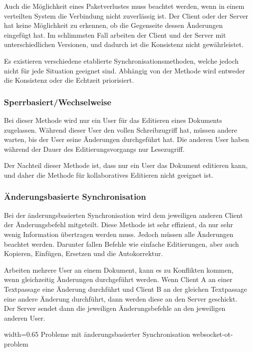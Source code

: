 Auch die Möglichkeit eines Paketverlustes muss beachtet werden, wenn in einem verteilten System die Verbindung nicht zuverlässig ist. Der Client oder der Server hat keine Möglichkeit zu erkennen, ob die Gegenseite dessen Änderungen eingefügt hat. Im schlimmsten Fall arbeiten der Client und der Server mit unterschiedlichen Versionen, und dadurch ist die Konsistenz nicht gewährleistet. \cite{websocket-consistency-tanenbaum}

Es existieren verschiedene etablierte Synchronisationsmethoden, welche jedoch nicht für jede Situation geeignet sind. Abhängig von der Methode wird entweder die Konsistenz oder die Echtzeit priorisiert.

\subsubsection{Sperrbasiert/Wechselweise}
Bei dieser Methode wird nur ein User für das Editieren eines Dokuments zugelassen. Während dieser User den vollen Schreibzugriff hat, müssen andere warten, bis der User seine Änderungen durchgeführt hat. Die anderen User haben während der Dauer des Editierungsvorgangs nur Lesezugriff. \cite{websocket-differential}

Der Nachteil dieser Methode ist, dass nur ein User das Dokument editieren kann, und daher die Methode für kollaboratives Editieren nicht geeignet ist.

\subsubsection{Änderungsbasierte Synchronisation}
Bei der änderungsbasierten Synchronisation wird dem jeweiligen anderen Client der Änderungsbefehl mitgeteilt. Diese Methode ist sehr effizient, da nur sehr wenig Information übertragen werden muss. Jedoch müssen alle Änderungen beachtet werden. Darunter fallen Befehle wie einfache Editierungen, aber auch Kopieren, Einfügen, Ersetzen und die Autokorrektur.

Arbeiten mehrere User an einem Dokument, kann es zu Konflikten kommen, wenn gleichzeitig Änderungen durchgeführt werden. Wenn Client A an einer Textpassage eine Änderung durchführt und Client B an der gleichen Textpassage eine andere Änderung durchführt, dann werden diese an den Server geschickt. Der Server sendet dann die jeweiligen Änderungsbefehle an den jeweiligen anderen User.

{width=0.65\textwidth}
{Probleme mit änderungsbasierter Synchronisation \cite{websocket-diffsync-presentation}}
{websocket-ot-problem}

